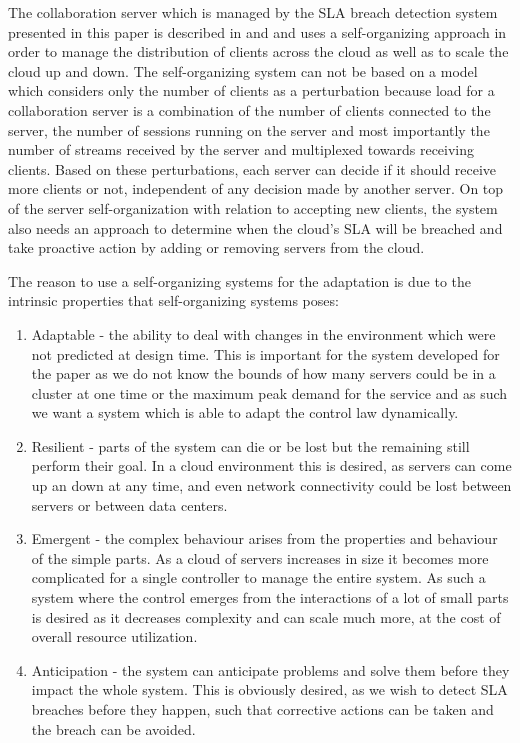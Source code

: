 \documentclass[conference]{IEEEtran}
\begin{document}
The collaboration server which is managed by the SLA breach detection system presented in this paper is described in \cite{bogdan:miles2012chapter} and \cite{bogdan:cts2012} and uses a self-organizing approach in order to manage the distribution of clients across the cloud as well as to scale the cloud up and down. The self-organizing system can not be based on a model which considers only the number of clients as a perturbation because load for a collaboration server is a combination of the number of clients connected to the server, the number of sessions running on the server and most importantly the number of streams received by the server and multiplexed towards receiving clients. Based on these perturbations, each server can decide if it should receive more clients or not, independent of any decision made by another server. On top of the server self-organization with relation to accepting new clients, the system also needs an approach to determine when the cloud's SLA will be breached and take proactive action by adding or removing servers from the cloud. 

The reason to use a self-organizing systems for the adaptation is due to the intrinsic properties that self-organizing systems poses:
\begin{enumerate}
	\item Adaptable - the ability to deal with changes in the environment which were not predicted at design time. This is important for the system developed for the paper as we do not know the bounds of how many servers could be in a cluster at one time or the maximum peak demand for the service and as such we want a system which is able to adapt the control law dynamically.
	\item Resilient - parts of the system can die or be lost but the remaining still perform their goal. In a cloud environment this is desired, as servers can come up an down at any time, and even network connectivity could be lost between servers or between data centers.
	\item Emergent - the complex behaviour arises from the properties and behaviour of the simple parts. As a cloud of servers increases in size it becomes more complicated for a single controller to manage the entire system. As such a system where the control emerges from the interactions of a lot of small parts is desired as it decreases complexity and can scale much more, at the cost of overall resource utilization.
	\item Anticipation - the system can anticipate problems and solve them before they impact the whole system. This is obviously desired, as we wish to detect SLA breaches before they happen, such that corrective actions can be taken and the breach can be avoided.
\end{enumerate}
\end{document}

